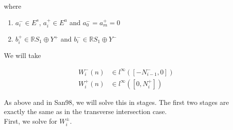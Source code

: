 \documentclass[12pt]{article}
\def\R{{\mathbb R}}
\begin{document}
where 

\begin{enumerate}
\item $a_i^- \in E^s$, $a_i^+ \in E^u$ and $a_0^- = a_m^+ = 0$
\item $b_i^+ \in \R S_1 \oplus Y^+$ and $b_i^- \in \R S_1 \oplus Y^-$
\end{enumerate}

We will take

\begin{align*}
W_i^-(n) &\in l^\infty([-N_{i-1}^-, 0]) \\
W_i^+(n) &\in l^\infty([0, N_i^+])
\end{align*}

As above and in San98, we will solve this in stages. The first two stages are exactly the same as in the transverse intersection case.
\\

First, we solve for $W_i^\pm$.\\

\end{document}
